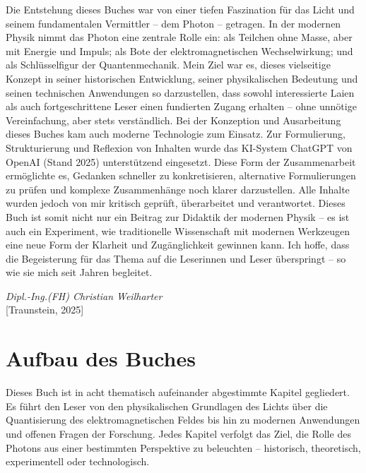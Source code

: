 Die Entstehung dieses Buches war von einer tiefen Faszination für das Licht und seinem fundamentalen Vermittler – dem Photon – getragen. In der modernen Physik nimmt das Photon eine zentrale Rolle ein: als Teilchen ohne Masse, aber mit Energie und Impuls; als Bote der elektromagnetischen Wechselwirkung; und als Schlüsselfigur der Quantenmechanik.
	\noindent
Mein Ziel war es, dieses vielseitige Konzept in seiner historischen Entwicklung, seiner physikalischen Bedeutung und seinen technischen Anwendungen so darzustellen, dass sowohl interessierte Laien als auch fortgeschrittene Leser einen fundierten Zugang erhalten – ohne unnötige Vereinfachung, aber stets verständlich.
	\noindent
Bei der Konzeption und Ausarbeitung dieses Buches kam auch moderne Technologie zum Einsatz. Zur Formulierung, Strukturierung und Reflexion von Inhalten wurde das KI-System ChatGPT von OpenAI (Stand 2025) unterstützend eingesetzt. Diese Form der Zusammenarbeit ermöglichte es, Gedanken schneller zu konkretisieren, alternative Formulierungen zu prüfen und komplexe Zusammenhänge noch klarer darzustellen.
Alle Inhalte wurden jedoch von mir kritisch geprüft, überarbeitet und verantwortet.
	\noindent
Dieses Buch ist somit nicht nur ein Beitrag zur Didaktik der modernen Physik – es ist auch ein Experiment, wie traditionelle Wissenschaft mit modernen Werkzeugen eine neue Form der Klarheit und Zugänglichkeit gewinnen kann.
	\noindent
Ich hoffe, dass die Begeisterung für das Thema auf die Leserinnen und Leser überspringt – so wie sie mich seit Jahren begleitet.



\begin{flushright}
	\textit{Dipl.-Ing.(FH) Christian Weilharter} \\
	\vspace{0.5em}
	[Traunstein, 2025]
\end{flushright}


\chapter*{Aufbau des Buches}

Dieses Buch ist in acht thematisch aufeinander abgestimmte Kapitel gegliedert. Es führt den Leser von den physikalischen Grundlagen des Lichts über die Quantisierung des elektromagnetischen Feldes bis hin zu modernen Anwendungen und offenen Fragen der Forschung. Jedes Kapitel verfolgt das Ziel, die Rolle des Photons aus einer bestimmten Perspektive zu beleuchten – historisch, theoretisch, experimentell oder technologisch.

